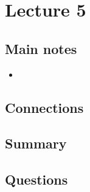 \section{Lecture 5}

\subsection{Main notes}


\begin{itemize}
	\item
\end{itemize}


\subsection{Connections}


\subsection{Summary}


\subsection{Questions}
